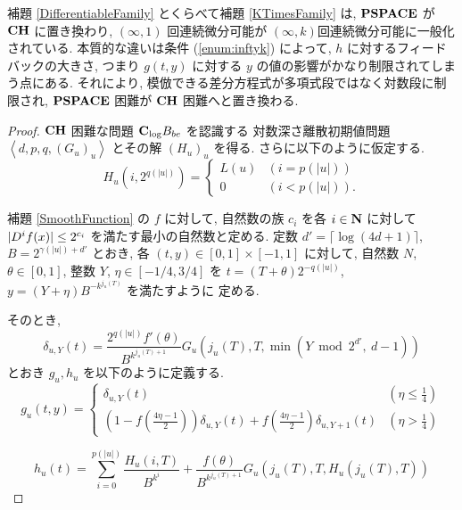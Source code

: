 補題 \ref{DifferentiableFamily} とくらべて補題 \ref{KTimesFamily} は,
$\mathbf{PSPACE}$ が $\mathbf{CH}$ に置き換わり, $(\infty, 1)$ 回連続微分可能が 
$(\infty, k)$回連続微分可能に一般化されている.
本質的な違いは条件 (\ref{enum:inftyk}) によって, $h$ に対するフィードバックの大きさ,
つまり $g(t,y)$ に対する $y$ の値の影響がかなり制限されてしまう点にある.
それにより, 模倣できる差分方程式が多項式段ではなく対数段に制限され,
$\mathbf{PSPACE}$ 困難が $\mathbf{CH}$ 困難へと置き換わる.



 \begin{proof}
  $\mathbf{CH}$ 困難な問題 $\mathbf{C}_{\log} B_{be}$ を認識する
  対数深さ離散初期値問題 $\left< d, p, q,(G_u)_u \right>$
  とその解 $(H_u)_u$ を得る. さらに以下のように仮定する.
  \begin{equation}
   H_u(i, 2^{q(|u|)}) = \begin{cases}
			L(u) & (i=p(|u|)) \\
			0 & (i<p(|u|)).
			\end{cases}
  \end{equation}

  補題 \ref{SmoothFunction} の $f$ に対して, 
  自然数の族 $c_i$ を各 $i \in \mathbf N$ に対して 
  $|D^i f(x)| \le 2^{c_i}$ を満たす最小の自然数と定める.
 定数 $d' = \lceil \log (4d + 1) \rceil$, 
 $B = 2^{\gamma(|u|) + d'}$ とおき, 
 各 $(t, y) \in [0,1] \times [-1, 1]$ に対して,
 自然数 $N$, $\theta \in [0,1]$, 整数 $Y$, $\eta \in [-1/4, 3/4]$ を
 $t = (T + \theta)2^{-q(|u|)}$, $y = (Y + \eta)B^{-k^{j_u(T)}}$ を満たすように
 定める.
 
 そのとき,
 \begin{equation}
  \delta_{u, Y} (t) = \frac{2^{q(|u|)} f'(\theta)}{B^{k^{j_u(T)+1}}} 
   G_u\left( j_u(T), T, \min \left(Y \bmod 2^{d'}\!\!\!,\ d-1 \right) \right)
 \end{equation}
 とおき $g_u, h_u$ を以下のように定義する.
 \begin{equation}
  g_u(t,y) 
  = \begin{cases}
     \delta_{u, Y}(t)
     & (\eta \le \frac 1 4)
     \\
     ( 1-f ( \frac{4\eta-1}{2})) \delta_{u, Y}(t) 
     + f ( \frac{4\eta-1}{2}) \delta_{u,Y+1}(t)
     & (\eta > \frac 1 4)
    \end{cases}
 \end{equation}

 \begin{equation} 
  h_u(t) = \sum^{p(|u|)}_{i=0} \frac{H_u(i, T)}{B^{k^i}}  
  + \frac{f(\theta)}{B^{k^{j_u(T)+1}}} G_u(j_u(T), T, H_u(j_u(T), T)) 
  \label{eq:hu}
 \end{equation}


\end{proof}
